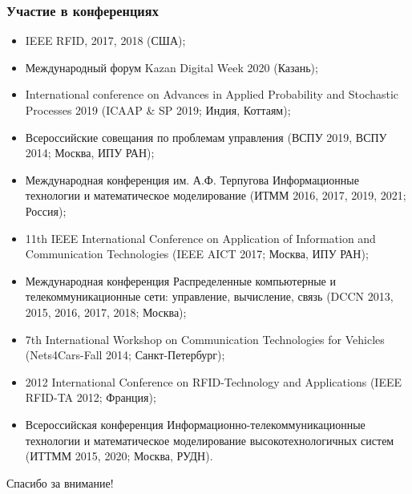 


\begin{frame}
    \frametitle{Участие в конференциях}
    \footnotesize
    \begin{itemize}
        \item IEEE RFID, 2017, 2018 (США);
        \item Международный форум Kazan Digital Week 2020 (Казань);
        \item International conference on Advances in Applied Probability and Stochastic Processes 2019 (ICAAP \& SP 2019; Индия, Коттаям);
        \item Всероссийские совещания по проблемам управления (ВСПУ 2019, ВСПУ 2014; Москва, ИПУ РАН);
        \item Международная конференция им. А.Ф. Терпугова Информационные технологии и математическое моделирование (ИТММ 2016, 2017, 2019, 2021; Россия);
        \item 11th IEEE International Conference on Application of Information and Communication Technologies (IEEE AICT 2017; Москва, ИПУ РАН);
        \item Международная конференция Распределенные компьютерные и телекоммуникационные сети: управление, вычисление, связь (DCCN 2013, 2015, 2016, 2017, 2018; Москва);
        \item 7th International Workshop on Communication Technologies for Vehicles (Nets4Cars-Fall 2014; Санкт-Петербург);
        \item 2012 International Conference on RFID-Technology and Applications (IEEE RFID-TA 2012; Франция);
        \item Всероссийская конференция Информационно-телекоммуникационные технологии и математическое моделирование высокотехнологичных систем (ИТТММ 2015, 2020; Москва, РУДН).
    \end{itemize}
\end{frame}

\begin{frame} %
    \begin{center}
        \Huge
        Спасибо за внимание!
    \end{center}
\end{frame}
